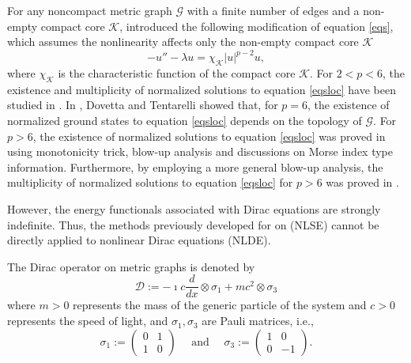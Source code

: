 \documentclass[11pt]{amsart}
\newcommand{\abs}[1]{\lvert#1\rvert}
\newcommand{\D}{\mathcal{D}}
\newcommand{\G}{\mathcal{G}}
\newcommand{\K}{\mathcal{K}}
\numberwithin{equation}{section}
\begin{document}
For any noncompact metric graph $\G$ with a finite number of edges and a non-empty compact
core $\K$, \cite{Gn,No} introduced the following modification of equation \eqref{eqs}, which assumes the nonlinearity affects only the non-empty compact core $\K$
\begin{equation}
\label{eqsloc}
    -u'' - \lambda u= \chi_\K\abs{u}^{p-2}u,
\end{equation}
where $\chi_\K$ is the characteristic function of the compact core $\K$. For $2<p<6$, the existence and multiplicity of normalized solutions to equation \eqref{eqsloc} have been studied in \cite{Se,Se1,Te}. In \cite{Do2}, Dovetta and Tentarelli showed that, for $p=6$, the existence of normalized ground states to equation \eqref{eqsloc} depends on the topology of $\G$. For $p > 6$, the existence of normalized solutions to equation \eqref{eqsloc} was proved in \cite{Bort} using monotonicity trick, blow-up analysis and discussions on Morse index type information. Furthermore, by employing a more general blow-up analysis, the multiplicity  of normalized solutions to equation \eqref{eqsloc} for $p > 6$ was proved in \cite{Ca}.

However, the energy functionals associated with Dirac equations are strongly indefinite. Thus, the methods previously developed  for on (NLSE) cannot be directly applied to nonlinear Dirac equations (NLDE).

The Dirac operator on metric graphs is denoted by
\begin{equation}
\label{eqdef}
    \D := -\imath c\frac{d}{dx} \otimes \sigma_1 +mc^2\otimes\sigma_3
\end{equation}
where $m > 0$ represents the mass of the generic particle of the system and $c > 0$ represents the speed of light, and $\sigma_1, \sigma_3$ are Pauli matrices, i.e.,
\begin{equation}
\label{eqdefsig}
\sigma_1:=\left(\begin{array}{ll}
0 & 1 \\
1 & 0
\end{array}\right) \quad \text { and } \quad \sigma_3:=\left(\begin{array}{cc}
1 & 0 \\
0 & -1
\end{array}\right).
\end{equation}
\end{document}
